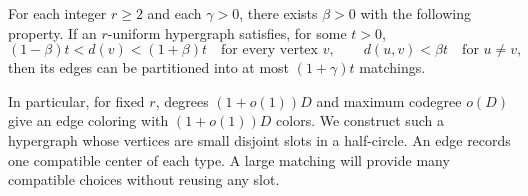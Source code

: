 \begin{theorem}
\label{thm:packing-edge-coloring}
For each integer $r\ge2$ and each $\gamma>0$, there exists $\beta>0$
with the following property.  If an $r$-uniform hypergraph satisfies,
for some $t>0$,
\[
 (1-\beta)t<d(v)<(1+\beta)t\quad\text{for every vertex }v,
 \qquad d(u,v)<\beta t\quad\text{for }u\ne v,
\]
then its edges can be partitioned into at most $(1+\gamma)t$ matchings.
\end{theorem}

In particular, for fixed $r$, degrees $(1+o(1))D$ and maximum
codegree $o(D)$ give an edge coloring with $(1+o(1))D$ colors.
We construct such a hypergraph whose vertices are small disjoint slots
in a half-circle.  An edge records one compatible center of each type.
A large matching will provide many compatible choices without reusing
any slot.

